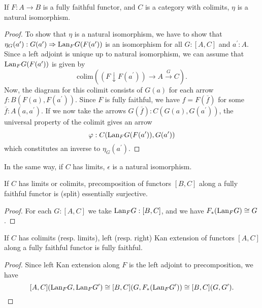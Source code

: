 \begin{lemma}
  If $ F : A \to B $ is a fully faithful functor, and $ C $ is a category with colimits, $ \eta $ is a natural isomorphism.
\end{lemma}
\begin{proof}
  To show that $ \eta $ is a natural isomorphism, we have to show that $ \eta_G(a^\prime): G(a^\prime) \Rightarrow \text{Lan}_{F}G(F(a^\prime)) $ is an isomorphism for all $ G: [A, C] $ and $ a^\prime: A $. Since a left adjoint is unique up to natural isomorphism, we can assume that $ \text{Lan}_{F}G(F(a^\prime)) $ is given by
  \[ \text{colim} ((F \downarrow F(a^\prime)) \to A \xrightarrow G C). \]
  Now, the diagram for this colimit consists of $ G(a) $ for each arrow $ f: B(F(a), F(a^\prime)) $. Since $ F $ is fully faithful, we have $ f = F(\overline f) $ for some $ \overline f: A(a, a^\prime) $. If we now take the arrows $ G(\overline f): C(G(a), G(a^\prime)) $, the universal property of the colimit gives an arrow
  \[ \varphi: C(\text{Lan}_{F}G(F(a^\prime)), G(a^\prime)) \]
  which constitutes an inverse to $ \eta_G(a^\prime) $.
\end{proof}

\begin{remark}
  In the same way, if $ C $ has limits, $ \epsilon $ is a natural isomorphism.
\end{remark}

\begin{corollary}
  If $ C $ has limits or colimits, precomposition of functors $ [B, C] $ along a fully faithful functor is (split) essentially surjective.
\end{corollary}
\begin{proof}
  For each $ G: [A, C] $ we take $ \text{Lan}_{F}G: [B, C] $, and we have $ F_*(\text{Lan}_{F}G) \cong G $.
\end{proof}

\begin{corollary}
  If $ C $ has colimits (resp. limits), left (resp. right) Kan extension of functors $ [A, C] $ along a fully faithful functor is fully faithful.
\end{corollary}
\begin{proof}
  Since left Kan extension along $ F $ is the left adjoint to precomposition, we have
  \[ [A, C](\text{Lan}_{F}G, \text{Lan}_{F}G^\prime) \cong [B, C](G, F_*(\text{Lan}_{F}G^\prime)) \cong [B, C](G, G^\prime). \]
\end{proof}


